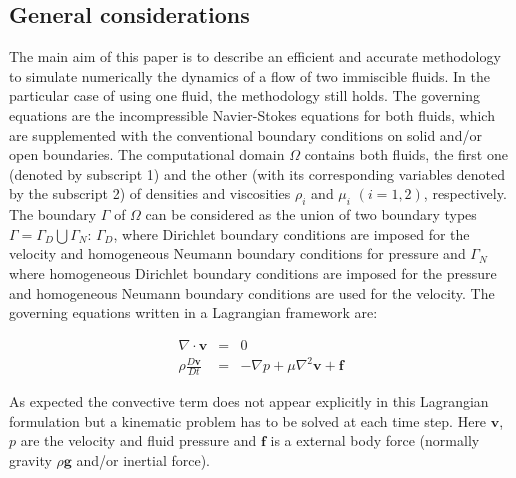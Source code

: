 \subsection{General considerations}\label{GeneralFor}

The main aim of this paper is to describe an efficient and accurate methodology to simulate numerically the dynamics of a flow of two immiscible fluids. In the particular case of using one fluid, the methodology still holds. The governing equations are the incompressible Navier-Stokes equations for both fluids, which are supplemented with the conventional boundary conditions on solid and/or open boundaries. The computational domain $\Omega$ contains both fluids, the first one (denoted by subscript 1) and the other (with its corresponding variables denoted by the subscript 2) of densities and viscosities $\rho_i$ and $\mu_i$ $(i=1,2)$, respectively. The boundary $\Gamma$ of $\Omega$ can be considered as the union of two boundary types $\Gamma=\Gamma_D\bigcup\Gamma_N$: $\Gamma_D$, where Dirichlet boundary conditions are imposed for the velocity and homogeneous Neumann boundary conditions for pressure and $\Gamma_N$ where homogeneous Dirichlet boundary conditions are imposed for the pressure and homogeneous Neumann boundary conditions are used for the velocity. The governing equations written in a Lagrangian framework are:

\begin{eqnarray}
  \nabla \cdot \mathbf{v} &=& 0 \label{eq:continuity} \\
  \rho\frac{D\mathbf{v}}{Dt} &=& -\nabla p + \mu \nabla^2 \mathbf{v} + \mathbf{f}\label{eq:momentum}
\end{eqnarray}

As expected the convective term does not appear explicitly in this Lagrangian formulation but a kinematic problem has to be solved at each time step. Here $\mathbf{v}$, $p$ are the velocity and fluid pressure and $\mathbf{f}$ is a external body force (normally gravity $\rho \mathbf{g}$ and/or inertial force).


